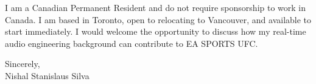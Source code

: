\documentclass[11pt]{article}
\begin{document}
\vspace{0.5em}
\noindent I am a Canadian Permanent Resident and do not require sponsorship to work in Canada. I am based in Toronto, open to relocating to Vancouver, and available to start immediately. I would welcome the opportunity to discuss how my real-time audio engineering background can contribute to EA SPORTS UFC.

\vspace{1em}
\noindent Sincerely, \\
Nishal Stanislaus Silva
\end{document}
